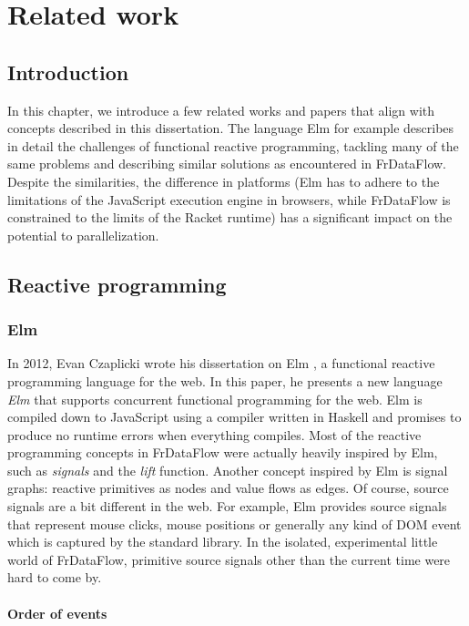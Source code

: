 \chapter{Related work}

\section{Introduction}

In this chapter, we introduce a few related works and papers that align with concepts described in this dissertation. The language Elm for example describes in detail the challenges of functional reactive programming, tackling many of the same problems and describing similar solutions as encountered in FrDataFlow. Despite the similarities, the difference in platforms (Elm has to adhere to the limitations of the JavaScript execution engine in browsers, while FrDataFlow is constrained to the limits of the Racket runtime) has a significant impact on the potential to parallelization. 

\section{Reactive programming}

\subsection{Elm}

In 2012, Evan Czaplicki wrote his dissertation on Elm \citep{czaplicki_elm:_2012}, a functional reactive programming language for the web. In this paper, he presents a new language \textit{Elm} that supports concurrent functional programming for the web. Elm is compiled down to JavaScript using a compiler written in Haskell and promises to produce no runtime errors when everything compiles. 
Most of the reactive programming concepts in FrDataFlow were actually heavily inspired by Elm, such as \textit{signals} and the \textit{lift} function. 
Another concept inspired by Elm is signal graphs: reactive primitives as nodes and value flows as edges. Of course, source signals are a bit different in the web. For example, Elm provides source signals that represent mouse clicks, mouse positions or generally any kind of DOM event which is captured by the standard library. In the isolated, experimental little world of FrDataFlow, primitive source signals other than the current time were hard to come by. 

\subsubsection{Order of events}

